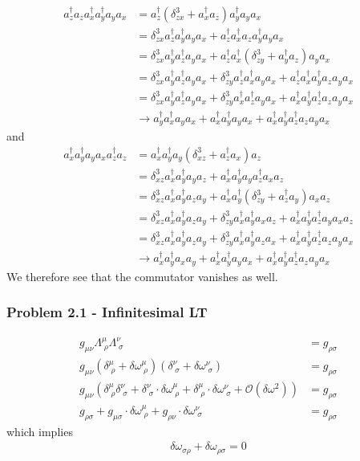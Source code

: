 \documentclass[10pt,a4paper]{book}
\theoremstyle{definition}
\begin{document}
\begin{align}
a^\dagger_za_za^\dagger_xa^\dagger_ya_ya_x
&=a^\dagger_z(\delta^3_{zx}+a^\dagger_xa_z)a^\dagger_ya_ya_x\\
&=\delta^3_{zx}a^\dagger_za^\dagger_ya_ya_x+a^\dagger_za^\dagger_xa_za^\dagger_ya_ya_x\\
&=\delta^3_{zx}a^\dagger_ya^\dagger_za_ya_x+a^\dagger_za^\dagger_x(\delta^3_{zy}+a^\dagger_ya_z)a_ya_x\\
&=\delta^3_{zx}a^\dagger_ya^\dagger_za_ya_x+\delta^3_{zy}a^\dagger_za^\dagger_xa_ya_x+a^\dagger_za^\dagger_xa^\dagger_ya_za_ya_x\\
&=\delta^3_{zx}a^\dagger_ya^\dagger_za_ya_x+\delta^3_{zy}a^\dagger_xa^\dagger_za_ya_x+a^\dagger_xa^\dagger_ya^\dagger_za_za_ya_x\\
&\rightarrow a^\dagger_ya^\dagger_xa_ya_x+a^\dagger_xa^\dagger_ya_ya_x+a^\dagger_xa^\dagger_ya^\dagger_za_za_ya_x
\end{align}
and
\begin{align}
a^\dagger_xa^\dagger_ya_ya_xa^\dagger_za_z
&=a^\dagger_xa^\dagger_ya_y(\delta^3_{xz}+a^\dagger_za_x)a_z\\
&=\delta^3_{xz}a^\dagger_xa^\dagger_ya_ya_z+a^\dagger_xa^\dagger_ya_ya^\dagger_za_xa_z\\
&=\delta^3_{xz}a^\dagger_xa^\dagger_ya_za_y+a^\dagger_xa^\dagger_y(\delta^3_{zy}+a^\dagger_za_y)a_xa_z\\
&=\delta^3_{xz}a^\dagger_xa^\dagger_ya_za_y+\delta^3_{zy}a^\dagger_xa^\dagger_ya_xa_z+a^\dagger_xa^\dagger_ya^\dagger_za_ya_xa_z\\
&=\delta^3_{xz}a^\dagger_xa^\dagger_ya_za_y+\delta^3_{zy}a^\dagger_xa^\dagger_ya_za_x+a^\dagger_xa^\dagger_ya^\dagger_za_za_ya_x\\
&\rightarrow a^\dagger_xa^\dagger_ya_xa_y+a^\dagger_xa^\dagger_ya_ya_x+a^\dagger_xa^\dagger_ya^\dagger_za_za_ya_x
\end{align}
We therefore see that the commutator vanishes as well.

\subsubsection{Problem 2.1 - Infinitesimal LT}
\begin{align}
g_{\mu\nu}\Lambda^\mu_{\;\rho}\Lambda^\nu_{\;\sigma}&=g_{\rho\sigma}\\
g_{\mu\nu}\left(\delta^\mu_{\;\rho}+\delta\omega^\mu_{\;\rho}\right)\left(\delta^\nu_{\;\sigma}+\delta\omega^\nu_{\;\sigma}\right)&=g_{\rho\sigma}\\
g_{\mu\nu}\left(\delta^\mu_{\;\rho}\delta^\nu_{\;\sigma}+\delta^\nu_{\;\sigma}\cdot\delta\omega^\mu_{\;\rho}+\delta^\mu_{\;\rho}\cdot\delta\omega^\nu_{\;\sigma}+\mathcal{O}(\delta\omega^2)\right)&=g_{\rho\sigma}\\
g_{\rho\sigma}+g_{\mu\sigma}\cdot\delta\omega^\mu_{\;\rho}+g_{\rho\nu}\cdot\delta\omega^\nu_{\;\sigma}&=g_{\rho\sigma}
\end{align}
which implies
\begin{align}
\delta\omega_{\sigma\rho}+\delta\omega_{\rho\sigma}=0
\end{align}
\end{document}
